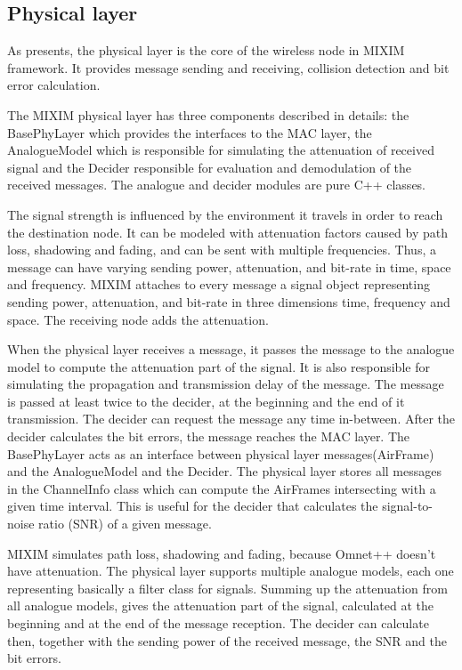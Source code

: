 \subsection{Physical layer}

As \cite{Kopke} presents, the physical layer is the core of the wireless node in
MIXIM framework. It provides message sending and receiving, collision detection
and bit error calculation.

The MIXIM physical layer has three components described in details: the
BasePhyLayer which provides the interfaces to the MAC layer, the AnalogueModel
which is responsible for simulating the attenuation of received signal and the
Decider responsible for evaluation and demodulation of the received messages.
The analogue and decider modules are pure C++ classes.

The signal strength is influenced by the environment it travels in order to
reach the destination node. It can be modeled with attenuation factors caused by
path loss, shadowing and fading, and can be sent with multiple frequencies.
Thus, a message can have varying sending power, attenuation, and bit-rate in
time, space and frequency. MIXIM attaches to every message a signal object
representing sending power, attenuation, and bit-rate in three dimensions time,
frequency and space. The receiving node adds the attenuation.

When the physical layer receives a message, it passes the message to the
analogue model to compute the attenuation part of the signal. It is
also responsible for simulating the propagation and transmission delay of the
message. The message is passed at least twice to the decider, at the beginning
and the end of it transmission. The decider can request the message any time
in-between. After the decider calculates the bit errors, the message reaches the
MAC layer. The BasePhyLayer acts as an interface between physical layer
messages(AirFrame) and the AnalogueModel and the Decider. The physical layer
stores all messages in the ChannelInfo class which can compute the AirFrames
intersecting with a given time interval. This is useful for the decider that
calculates the signal-to-noise ratio (SNR) of a given message.

MIXIM simulates path loss, shadowing and fading, because Omnet++ doesn't have
attenuation. The physical layer supports multiple analogue models, each one
representing basically a filter class for signals. Summing up the attenuation
from all analogue models, gives the attenuation part of the signal, calculated
at the beginning and at the end of the message reception. The decider can
calculate then, together with the sending power of the received message, the SNR
and the bit errors.

